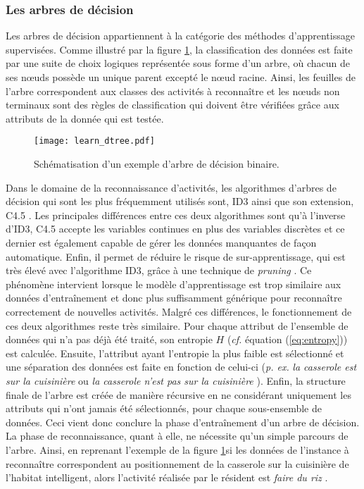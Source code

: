 \subsubsection{Les arbres de décision}

Les arbres de décision appartiennent à la catégorie des méthodes d'apprentissage supervisées. Comme illustré par la figure \ref{fig:learn_dtree}, la classification des données est faite par une suite de choix logiques représentée sous forme d'un arbre, où chacun de ses n\oe{}uds possède un unique parent excepté le n\oe{}ud racine. Ainsi, les feuilles de l'arbre correspondent aux classes des activités à reconnaître et les n\oe{}uds non terminaux sont des règles de classification qui doivent être vérifiées grâce aux attributs de la donnée qui est testée.

\begin{figure}[H]
	\centering
	\texttt{[image: learn\_dtree.pdf]}
	\caption{Schématisation d'un exemple d'arbre de décision binaire.}
	\label{fig:learn_dtree}
\end{figure}

Dans le domaine de la reconnaissance d'activités, les algorithmes d'arbres de décision qui sont les plus fréquemment utilisés sont, \ac{ID3} ainsi que son extension, C4.5 \citep{QuinlanRoss1993}. Les principales différences entre ces deux algorithmes sont qu'à l'inverse d'\acs{ID3}, C4.5 accepte les variables continues en plus des variables discrètes et ce dernier est également capable de gérer les données manquantes de façon automatique. Enfin, il permet de réduire le risque de sur-apprentissage, qui est très élevé avec l'algorithme \acs{ID3}, grâce à une technique de \textit{pruning} \citep{Bao2004, Ravi2005, Tapia2007}. Ce phénomène intervient lorsque le modèle d'apprentissage est trop similaire aux données d'entraînement et donc plus suffisamment générique pour reconnaître correctement de nouvelles activités. Malgré ces différences, le fonctionnement de ces deux algorithmes reste très similaire. Pour chaque attribut de l'ensemble de données qui n'a pas déjà été traité, son entropie $H$ (\textit{cf. } équation (\ref{eq:entropy})) est calculée. Ensuite, l'attribut ayant l'entropie la plus faible est sélectionné et une séparation des données est faite en fonction de celui-ci (\textit{p. ex.} \og \textit{la casserole est sur la cuisinière} \fg ou \og \textit{la casserole n'est pas sur la cuisinière} \fg). Enfin, la structure finale de l'arbre est créée de manière récursive en ne considérant uniquement les attributs qui n'ont jamais été sélectionnés, pour chaque sous-ensemble de données. Ceci vient donc conclure la phase d'entraînement d'un arbre de décision. La phase de reconnaissance, quant à elle, ne nécessite qu'un simple parcours de l'arbre. Ainsi, en reprenant l'exemple de la figure \ref{fig:learn_dtree}\textemdash si les données de l'instance à reconnaître correspondent au positionnement de la casserole sur la cuisinière de l'habitat intelligent, alors l'activité réalisée par le résident est \og \textit{faire du riz} \fg.


